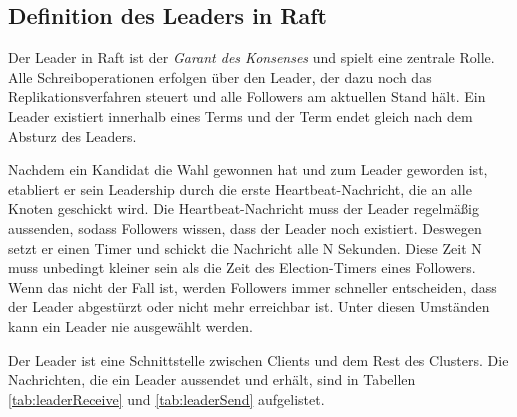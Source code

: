 \subsection{Definition des Leaders in Raft}

Der Leader in Raft ist der \textit{Garant des Konsenses} und spielt eine zentrale Rolle. Alle Schreiboperationen erfolgen über den Leader, der dazu noch das Replikationsverfahren steuert und alle Followers am aktuellen Stand hält. Ein Leader existiert innerhalb eines Terms und der Term endet gleich nach dem Absturz des Leaders.

Nachdem ein Kandidat die Wahl gewonnen hat und zum Leader geworden ist, etabliert er sein Leadership durch die erste Heartbeat-Nachricht, die an alle Knoten geschickt wird. Die Heartbeat-Nachricht muss der Leader regelmäßig aussenden, sodass Followers wissen, dass der Leader noch existiert. Deswegen setzt er einen Timer und schickt die Nachricht alle N Sekunden. Diese Zeit N muss unbedingt kleiner sein als die Zeit des Election-Timers eines Followers. Wenn das nicht der Fall ist, werden Followers immer schneller entscheiden, dass der Leader abgestürzt oder nicht mehr erreichbar ist. Unter diesen Umständen kann ein Leader nie ausgewählt werden.

Der Leader ist eine Schnittstelle zwischen Clients und dem Rest des Clusters. Die Nachrichten, die ein Leader aussendet und erhält, sind in Tabellen \ref{tab:leaderReceive} und \ref{tab:leaderSend} aufgelistet.

